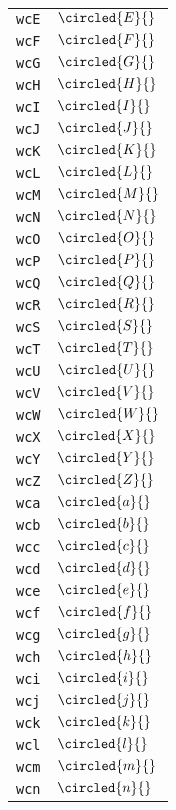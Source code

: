\begin{longtable}{ll}
\texttt{wcE}&${}\circled{E}{}$\\
\texttt{wcF}&${}\circled{F}{}$\\
\texttt{wcG}&${}\circled{G}{}$\\
\texttt{wcH}&${}\circled{H}{}$\\
\texttt{wcI}&${}\circled{I}{}$\\
\texttt{wcJ}&${}\circled{J}{}$\\
\texttt{wcK}&${}\circled{K}{}$\\
\texttt{wcL}&${}\circled{L}{}$\\
\texttt{wcM}&${}\circled{M}{}$\\
\texttt{wcN}&${}\circled{N}{}$\\
\texttt{wcO}&${}\circled{O}{}$\\
\texttt{wcP}&${}\circled{P}{}$\\
\texttt{wcQ}&${}\circled{Q}{}$\\
\texttt{wcR}&${}\circled{R}{}$\\
\texttt{wcS}&${}\circled{S}{}$\\
\texttt{wcT}&${}\circled{T}{}$\\
\texttt{wcU}&${}\circled{U}{}$\\
\texttt{wcV}&${}\circled{V}{}$\\
\texttt{wcW}&${}\circled{W}{}$\\
\texttt{wcX}&${}\circled{X}{}$\\
\texttt{wcY}&${}\circled{Y}{}$\\
\texttt{wcZ}&${}\circled{Z}{}$\\
\texttt{wca}&${}\circled{a}{}$\\
\texttt{wcb}&${}\circled{b}{}$\\
\texttt{wcc}&${}\circled{c}{}$\\
\texttt{wcd}&${}\circled{d}{}$\\
\texttt{wce}&${}\circled{e}{}$\\
\texttt{wcf}&${}\circled{f}{}$\\
\texttt{wcg}&${}\circled{g}{}$\\
\texttt{wch}&${}\circled{h}{}$\\
\texttt{wci}&${}\circled{i}{}$\\
\texttt{wcj}&${}\circled{j}{}$\\
\texttt{wck}&${}\circled{k}{}$\\
\texttt{wcl}&${}\circled{l}{}$\\
\texttt{wcm}&${}\circled{m}{}$\\
\texttt{wcn}&${}\circled{n}{}$\\

\end{longtable}
